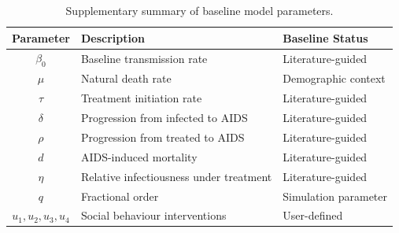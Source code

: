 \documentclass[12pt,a4paper,oneside]{report}
\begin{document}
\begin{table}[H]
\centering
\small
\renewcommand{\arraystretch}{1.15}
\caption{Supplementary summary of baseline model parameters.}
\label{tab:appendix_parameter_summary}
\begin{tabular}{>{\bfseries}c p{6.5cm}p{3cm}}
\toprule
Parameter & Description & Baseline Status\\
\midrule
$\beta_0$ & Baseline transmission rate & Literature-guided\\
$\mu$ & Natural death rate & Demographic context\\
$\tau$ & Treatment initiation rate & Literature-guided\\
$\delta$ & Progression from infected to AIDS & Literature-guided\\
$\rho$ & Progression from treated to AIDS & Literature-guided\\
$d$ & AIDS-induced mortality & Literature-guided\\
$\eta$ & Relative infectiousness under treatment & Literature-guided\\
$q$ & Fractional order & Simulation parameter\\
$u_1,u_2,u_3,u_4$ & Social behaviour interventions & User-defined\\
\bottomrule
\end{tabular}
\end{table}
\end{document}
